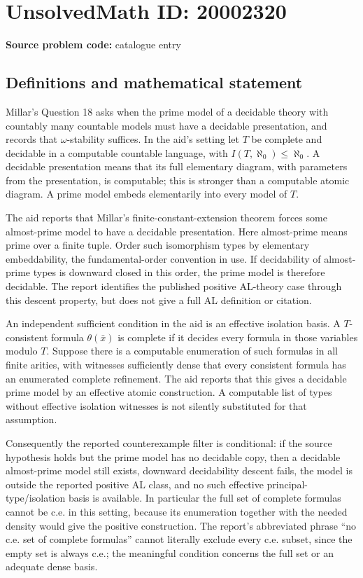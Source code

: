 \documentclass[11pt]{article}
\begin{document}
\section*{UnsolvedMath ID: 20002320}
\textbf{Source problem code:} catalogue entry
\subsection{Definitions and mathematical statement}
Millar's Question 18 asks when the prime model of a decidable theory with countably many countable models must have a decidable presentation, and records that \(\omega\)-stability suffices. In the aid's setting let \(T\) be complete and decidable in a computable countable language, with \(I(T,\aleph_0)\leq\aleph_0\). A decidable presentation means that its full elementary diagram, with parameters from the presentation, is computable; this is stronger than a computable atomic diagram. A prime model embeds elementarily into every model of \(T\).

The aid reports that Millar's finite-constant-extension theorem forces some almost-prime model to have a decidable presentation. Here almost-prime means prime over a finite tuple. Order such isomorphism types by elementary embeddability, the fundamental-order convention in use. If decidability of almost-prime types is downward closed in this order, the prime model is therefore decidable. The report identifies the published positive AL-theory case through this descent property, but does not give a full AL definition or citation.

An independent sufficient condition in the aid is an effective isolation basis. A \(T\)-consistent formula \(\theta(\bar x)\) is complete if it decides every formula in those variables modulo \(T\). Suppose there is a computable enumeration of such formulas in all finite arities, with witnesses sufficiently dense that every consistent formula has an enumerated complete refinement. The aid reports that this gives a decidable prime model by an effective atomic construction. A computable list of types without effective isolation witnesses is not silently substituted for that assumption.

Consequently the reported counterexample filter is conditional: if the source hypothesis holds but the prime model has no decidable copy, then a decidable almost-prime model still exists, downward decidability descent fails, the model is outside the reported positive AL class, and no such effective principal-type/isolation basis is available. In particular the full set of complete formulas cannot be c.e. in this setting, because its enumeration together with the needed density would give the positive construction. The report's abbreviated phrase ``no c.e. set of complete formulas'' cannot literally exclude every c.e. subset, since the empty set is always c.e.; the meaningful condition concerns the full set or an adequate dense basis.
\end{document}
